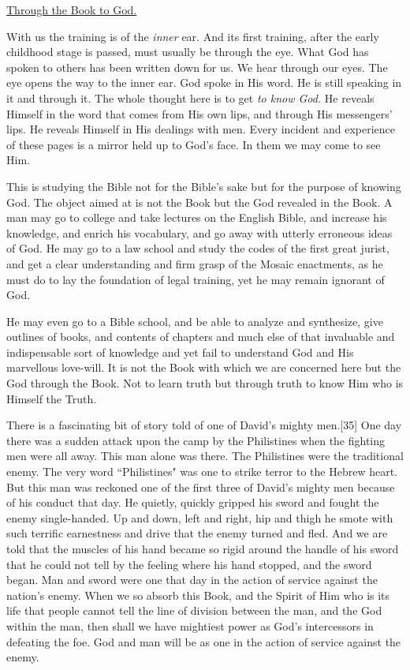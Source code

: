 \underline{Through the Book to God.}


With us the training is of the \textit{inner} ear. And its first training, after
the early childhood stage is passed, must usually be through the eye. What
God has spoken to others has been written down for us. We hear through our
eyes. The eye opens the way to the inner ear. God spoke in His word. He is
still speaking in it and through it. The whole thought here is to get \textit{to
know God.} He reveals Himself in the word that comes from His own lips,
and through His messengers' lips. He reveals Himself in His dealings with
men. Every incident and experience of these pages is a mirror held up to
God's face. In them we may come to see Him.

This is studying the Bible not for the Bible's sake but for the purpose of
knowing God. The object aimed at is not the Book but the God revealed in
the Book. A man may go to college and take lectures on the English Bible,
and increase his knowledge, and enrich his vocabulary, and go away with
utterly erroneous ideas of God. He may go to a law school and study the
codes of the first great jurist, and get a clear understanding and firm
grasp of the Mosaic enactments, as he must do to lay the foundation of
legal training, yet he may remain ignorant of God.

He may even go to a Bible school, and be able to analyze and synthesize,
give outlines of books, and contents of chapters and much else of that
invaluable and indispensable sort of knowledge and yet fail to understand
God and His marvellous love-will. It is not the Book with which we are
concerned here but the God through the Book. Not to learn truth but
through truth to know Him who is Himself the Truth.

There is a fascinating bit of story told of one of David's mighty men.[35]
One day there was a sudden attack upon the camp by the Philistines when
the fighting men were all away. This man alone was there. The Philistines
were the traditional enemy. The very word ``Philistines" was one to strike
terror to the Hebrew heart. But this man was reckoned one of the first
three of David's mighty men because of his conduct that day. He quietly,
quickly gripped his sword and fought the enemy single-handed. Up and down,
left and right, hip and thigh he smote with such terrific earnestness and
drive that the enemy turned and fled. And we are told that the muscles of
his hand became so rigid around the handle of his sword that he could not
tell by the feeling where his hand stopped, and the sword began. Man and
sword were one that day in the action of service against the nation's
enemy. When we so absorb this Book, and the Spirit of Him who is its life
that people cannot tell the line of division between the man, and the God
within the man, then shall we have mightiest power as God's intercessors
in defeating the foe. God and man will be as one in the action of service
against the enemy.



